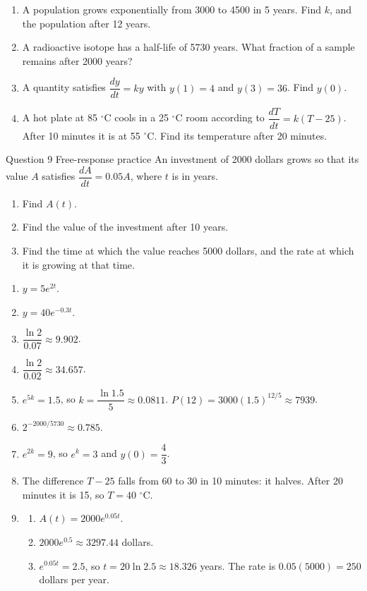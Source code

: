 \documentclass[11pt]{article}
\begin{document}
\begin{enumerate}[leftmargin=*,itemsep=2pt,start=5]
  \item A population grows exponentially from 3000 to 4500 in 5 years. Find $k$, and the population after 12 years.\work{2.8cm}
  \item A radioactive isotope has a half-life of 5730 years. What fraction of a sample remains after 2000 years?\work{2.8cm}
  \item A quantity satisfies $\dfrac{dy}{dt}=ky$ with $y(1)=4$ and $y(3)=36$. Find $y(0)$.\work{2.8cm}
  \item A hot plate at 85 $^\circ$C cools in a 25 $^\circ$C room according to $\dfrac{dT}{dt}=k(T-25)$. After 10 minutes it is at 55 $^\circ$C. Find its temperature after 20 minutes.\work{2.8cm}
\end{enumerate}

\begin{frbox}{Question 9 \textperiodcentered{} Free-response practice}
An investment of 2000 dollars grows so that its value $A$ satisfies $\dfrac{dA}{dt}=0.05A$, where $t$ is in years.
\begin{enumerate}[label=(\alph*),leftmargin=*,itemsep=2pt]
  \item Find $A(t)$.\work{2.6cm}
  \item Find the value of the investment after 10 years.\work{2.6cm}
  \item Find the time at which the value reaches 5000 dollars, and the rate at which it is growing at that time.\work{2.6cm}
\end{enumerate}
\end{frbox}

\newpage
\begin{solbox}
\begin{enumerate}[leftmargin=*,itemsep=4pt]
  \item $y=5e^{2t}$.
  \item $y=40e^{-0.3t}$.
  \item $\dfrac{\ln2}{0.07}\approx9.902$.
  \item $\dfrac{\ln2}{0.02}\approx34.657$.
  \item $e^{5k}=1.5$, so $k=\dfrac{\ln1.5}{5}\approx0.0811$. $P(12)=3000(1.5)^{12/5}\approx7939$.
  \item $2^{-2000/5730}\approx0.785$.
  \item $e^{2k}=9$, so $e^{k}=3$ and $y(0)=\dfrac43$.
  \item The difference $T-25$ falls from 60 to 30 in 10 minutes: it halves. After 20 minutes it is 15, so $T=40$ $^\circ$C.
  \item \begin{enumerate}[label=(\alph*),leftmargin=*,itemsep=3pt]
    \item $A(t)=2000e^{0.05t}$.
    \item $2000e^{0.5}\approx3297.44$ dollars.
    \item $e^{0.05t}=2.5$, so $t=20\ln2.5\approx18.326$ years. The rate is $0.05(5000)=250$ dollars per year.
  \end{enumerate}
\end{enumerate}
\end{solbox}
\end{document}
